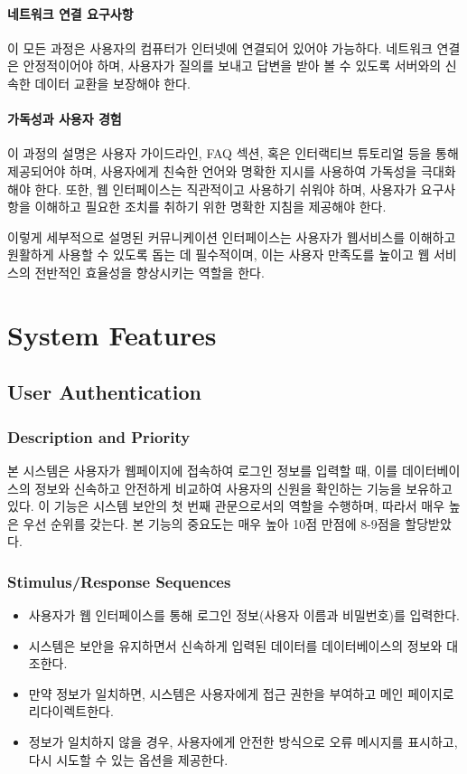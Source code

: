 \documentclass[a4paper, 12pt]{article}
\begin{document}
\paragraph{네트워크 연결 요구사항}
이 모든 과정은 사용자의 컴퓨터가 인터넷에 연결되어 있어야 가능하다. 네트워크 연결은 안정적이어야 하며, 사용자가 질의를 보내고 답변을 받아 볼 수 있도록 서버와의 신속한 데이터 교환을 보장해야 한다.

\paragraph{가독성과 사용자 경험}
이 과정의 설명은 사용자 가이드라인, FAQ 섹션, 혹은 인터랙티브 튜토리얼 등을 통해 제공되어야 하며, 사용자에게 친숙한 언어와 명확한 지시를 사용하여 가독성을 극대화해야 한다. 또한, 웹 인터페이스는 직관적이고 사용하기 쉬워야 하며, 사용자가 요구사항을 이해하고 필요한 조치를 취하기 위한 명확한 지침을 제공해야 한다.

이렇게 세부적으로 설명된 커뮤니케이션 인터페이스는 사용자가 웹서비스를 이해하고 원활하게 사용할 수 있도록 돕는 데 필수적이며, 이는 사용자 만족도를 높이고 웹 서비스의 전반적인 효율성을 향상시키는 역할을 한다.
\section{System Features}

\subsection{User Authentication}

\subsubsection{Description and Priority}
본 시스템은 사용자가 웹페이지에 접속하여 로그인 정보를 입력할 때, 이를 데이터베이스의 정보와 신속하고 안전하게 비교하여 사용자의 신원을 확인하는 기능을 보유하고 있다. 이 기능은 시스템 보안의 첫 번째 관문으로서의 역할을 수행하며, 따라서 매우 높은 우선 순위를 갖는다. 본 기능의 중요도는 매우 높아 10점 만점에 8-9점을 할당받았다.

\subsubsection{Stimulus/Response Sequences}
\begin{itemize}
  \item 사용자가 웹 인터페이스를 통해 로그인 정보(사용자 이름과 비밀번호)를 입력한다.
  \item 시스템은 보안을 유지하면서 신속하게 입력된 데이터를 데이터베이스의 정보와 대조한다.
  \item 만약 정보가 일치하면, 시스템은 사용자에게 접근 권한을 부여하고 메인 페이지로 리다이렉트한다.
  \item 정보가 일치하지 않을 경우, 사용자에게 안전한 방식으로 오류 메시지를 표시하고, 다시 시도할 수 있는 옵션을 제공한다.
\end{itemize}
\end{document}
